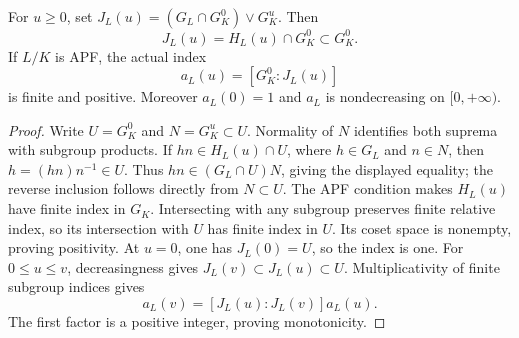 \begin{lemma}
\label{fw:apf-inertia-indices}
\leanok
For $u\geq0$, set $J_L(u)=(G_L\cap G_K^0)\vee G_K^u$. Then
\[
 J_L(u)=H_L(u)\cap G_K^0\subset G_K^0.
\]
If $L/K$ is APF, the actual index
\[
 a_L(u)=[G_K^0:J_L(u)]
\]
is finite and positive. Moreover $a_L(0)=1$ and $a_L$ is nondecreasing
on $[0,+\infty)$.
\end{lemma}
\begin{proof}
Write $U=G_K^0$ and $N=G_K^u\subset U$. Normality of $N$ identifies both
suprema with subgroup products. If $hn\in H_L(u)\cap U$, where
$h\in G_L$ and $n\in N$, then $h=(hn)n^{-1}\in U$. Thus
$hn\in(G_L\cap U)N$, giving the displayed equality; the reverse
inclusion follows directly from $N\subset U$.
The APF condition makes $H_L(u)$ have finite index in $G_K$. Intersecting
with any subgroup preserves finite relative index, so its intersection
with $U$ has finite index in $U$. Its coset space is nonempty, proving
positivity. At $u=0$, one has $J_L(0)=U$, so the index is one.
For $0\leq u\leq v$, decreasingness gives $J_L(v)\subset J_L(u)\subset U$.
Multiplicativity of finite subgroup indices gives
\[
 a_L(v)=[J_L(u):J_L(v)]a_L(u).
\]
The first factor is a positive integer, proving monotonicity.
\end{proof}

